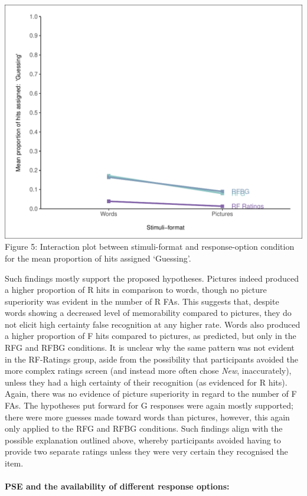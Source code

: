 \documentclass[
  11pt,
]{article}
\begin{document}
\includegraphics{R--Thesis_files/figure-latex/unnamed-chunk-18-1.pdf}
Figure 5: Interaction plot between stimuli-format and response-option
condition for the mean proportion of hits assigned `Guessing'.

Such findings mostly support the proposed hypotheses. Pictures indeed
produced a higher proportion of R hits in comparison to words, though no
picture superiority was evident in the number of R FAs. This suggests
that, despite words showing a decreased level of memorability compared
to pictures, they do not elicit high certainty false recognition at any
higher rate. Words also produced a higher proportion of F hits compared
to pictures, as predicted, but only in the RFG and RFBG conditions. It
is unclear why the same pattern was not evident in the RF-Ratings group,
aside from the possibility that participants avoided the more complex
ratings screen (and instead more often chose \emph{New}, inaccurately),
unless they had a high certainty of their recognition (as evidenced for
R hits). Again, there was no evidence of picture superiority in regard
to the number of F FAs. The hypotheses put forward for G responses were
again mostly supported; there were more guesses made toward words than
pictures, however, this again only applied to the RFG and RFBG
conditions. Such findings align with the possible explanation outlined
above, whereby participants avoided having to provide two separate
ratings unless they were very certain they recognised the item.

\hypertarget{pse-and-the-availability-of-different-response-options}{%
\paragraph{PSE and the availability of different response
options:}\label{pse-and-the-availability-of-different-response-options}}
\end{document}
